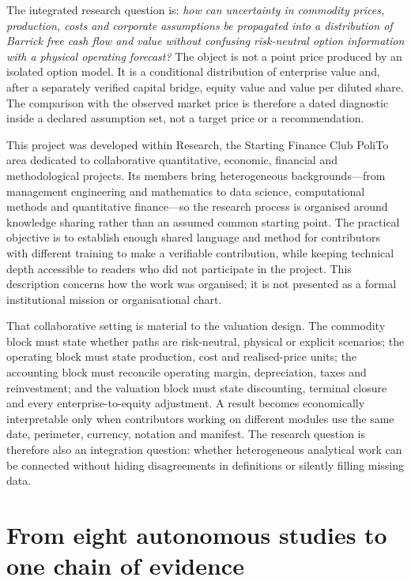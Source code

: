 The integrated research question is: \emph{how can uncertainty in commodity
prices, production, costs and corporate assumptions be propagated into a
distribution of Barrick free cash flow and value without confusing
risk-neutral option information with a physical operating forecast?} The
object is not a point price produced by an isolated option model. It is a
conditional distribution of enterprise value and, after a separately verified
capital bridge, equity value and value per diluted share. The comparison with
the observed market price is therefore a dated diagnostic inside a declared
assumption set, not a target price or a recommendation.

This project was developed within Research, the Starting Finance Club PoliTo
area dedicated to collaborative quantitative, economic, financial and
methodological projects. Its members bring heterogeneous backgrounds---from
management engineering and mathematics to data science, computational methods
and quantitative finance---so the research process is organised around
knowledge sharing rather than an assumed common starting point. The practical
objective is to establish enough shared language and method for contributors
with different training to make a verifiable contribution, while keeping
technical depth accessible to readers who did not participate in the project.
This description concerns how the work was organised; it is not presented as a
formal institutional mission or organisational chart.

That collaborative setting is material to the valuation design. The commodity
block must state whether paths are risk-neutral, physical or explicit
scenarios; the operating block must state production, cost and realised-price
units; the accounting block must reconcile operating margin, depreciation,
taxes and reinvestment; and the valuation block must state discounting,
terminal closure and every enterprise-to-equity adjustment. A result becomes
economically interpretable only when contributors working on different modules
use the same date, perimeter, currency, notation and manifest. The research
question is therefore also an integration question: whether heterogeneous
analytical work can be connected without hiding disagreements in definitions
or silently filling missing data.

\section{From eight autonomous studies to one chain of evidence}

